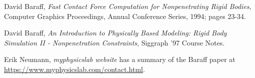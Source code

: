 \documentclass[final]{article}
\begin{document}
\begin{thebibliography}{9}
  David Baraff,
  \emph{Fast Contact Force Computation for Nonpenetrating Rigid Bodies},
  Computer Graphics Proceedings, Annual Conference Series, 1994; pages 23-34.

  David Baraff,
  \emph{An Introduction to Physically Based Modeling: Rigid Body Simulation
  II - Nonpenetration Constraints},
  Siggraph '97 Course Notes.

  Erik Neumann,
  \emph{myphysicslab website} has a summary of the Baraff paper at\\
  \url{https://www.myphysicslab.com/contact.html}.

\end{thebibliography}

\end{document}
